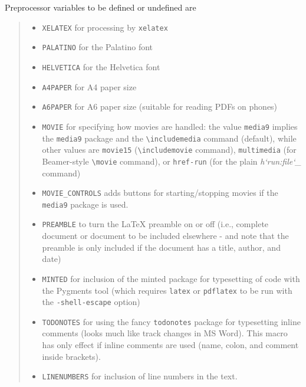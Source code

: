 \documentclass[a4paper]{article}
\providecommand*{\DUroletitlereference}[1]{\textsl{#1}}
\begin{document}
Preprocessor variables to be defined or undefined are
%
\begin{quote}
%
\begin{itemize}

\item \texttt{XELATEX} for processing by \texttt{xelatex}

\item \texttt{PALATINO} for the Palatino font

\item \texttt{HELVETICA} for the Helvetica font

\item \texttt{A4PAPER} for A4 paper size

\item \texttt{A6PAPER} for A6 paper size (suitable for reading PDFs on phones)

\item \texttt{MOVIE} for specifying how movies are handled: the value \texttt{media9}
implies the \texttt{media9} package and the \texttt{\textbackslash{}includemedia} command (default),
while other values are \texttt{movie15} (\texttt{\textbackslash{}includemovie} command),
\texttt{multimedia} (for Beamer-style \texttt{\textbackslash{}movie} command),
or \texttt{href-run} (for the plain \DUroletitlereference{h`run:file`\_} command)

\item \texttt{MOVIE\_CONTROLS} adds buttons for starting/stopping movies if the
\texttt{media9} package is used.

\item \texttt{PREAMBLE} to turn the LaTeX preamble on or off (i.e., complete document
or document to be included elsewhere - and note that
the preamble is only included
if the document has a title, author, and date)

\item \texttt{MINTED} for inclusion of the minted package for typesetting of
code with the Pygments tool (which requires \texttt{latex}
or \texttt{pdflatex} to be run with the \texttt{-shell-escape} option)

\item \texttt{TODONOTES} for using the fancy \texttt{todonotes} package for typesetting
inline comments (looks much like track changes in MS Word). This
macro has only effect if inline comments are used (name, colon,
and comment inside brackets).

\item \texttt{LINENUMBERS} for inclusion of line numbers in the text.


\end{itemize}
\end{quote}
\end{document}
